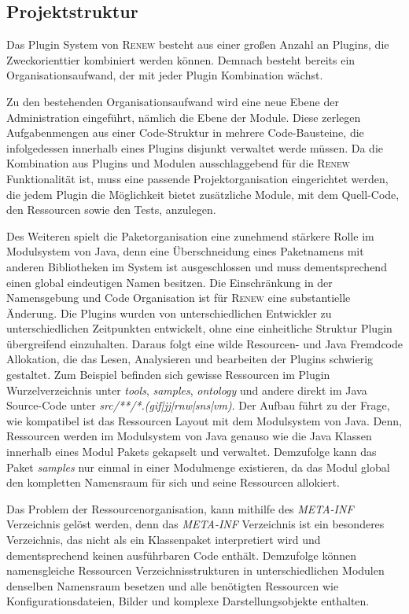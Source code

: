 	\subsection{Projektstruktur} \label{sub:projektstrukutr}
		Das Plugin System von \textsc{Renew} besteht aus einer großen Anzahl an Plugins, die Zweckorienttier kombiniert werden können. Demnach besteht bereits ein Organisationsaufwand, der mit jeder Plugin Kombination wächst. \bigbreak

		Zu den bestehenden Organisationsaufwand wird eine neue Ebene der Administration eingeführt, nämlich die Ebene der Module. Diese zerlegen Aufgabenmengen aus einer Code-Struktur in mehrere Code-Bausteine, die infolgedessen innerhalb eines Plugins disjunkt verwaltet werde müssen.\newline
		Da die Kombination aus Plugins und Modulen ausschlaggebend für die \textsc{Renew} Funktionalität ist, muss eine passende Projektorganisation eingerichtet werden, die jedem Plugin die Möglichkeit bietet zusätzliche Module, mit dem Quell-Code, den Ressourcen sowie den Tests, anzulegen.\bigbreak

		Des Weiteren spielt die Paketorganisation eine zunehmend stärkere Rolle im Modulsystem von Java, denn eine Überschneidung eines Paketnamens mit anderen Bibliotheken im System ist ausgeschlossen und muss dementsprechend einen global eindeutigen Namen besitzen. \newline
		Die Einschränkung in der Namensgebung und Code Organisation ist für \textsc{Renew} eine substantielle Änderung. Die Plugins wurden von unterschiedlichen Entwickler zu unterschiedlichen Zeitpunkten entwickelt, ohne eine einheitliche Struktur Plugin übergreifend einzuhalten. Daraus folgt eine wilde Resourcen- und Java Fremdcode Allokation, die das Lesen, Analysieren und bearbeiten der Plugins schwierig gestaltet. Zum Beispiel befinden sich gewisse Ressourcen im Plugin Wurzelverzeichnis unter \textit{tools}, \textit{samples}, \textit{ontology} und andere direkt im Java Source-Code unter \textit{src/**/*.(gif|jj|rnw|sns|vm)}. Der Aufbau führt zu der Frage, wie kompatibel ist das Ressourcen Layout mit dem Modulsystem von Java. Denn, Ressourcen werden im Modulsystem von Java genauso wie die Java Klassen innerhalb eines Modul Pakets gekapselt und verwaltet. Demzufolge kann das Paket \textit{samples} nur einmal in einer Modulmenge existieren, da das Modul global den kompletten Namensraum für sich und seine Ressourcen allokiert. \bigbreak 

		Das Problem der Ressourcenorganisation, kann mithilfe des \textit{META-INF} Verzeichnis gelöst werden, denn das \textit{META-INF} Verzeichnis ist ein besonderes Verzeichnis, das nicht als ein Klassenpaket interpretiert wird und dementsprechend keinen ausführbaren Code enthält. Demzufolge können namensgleiche Ressourcen Verzeichnisstrukturen in unterschiedlichen Modulen denselben Namensraum besetzen und alle benötigten Ressourcen wie Konfigurationsdateien, Bilder und komplexe Darstellungsobjekte enthalten.\bigbreak


